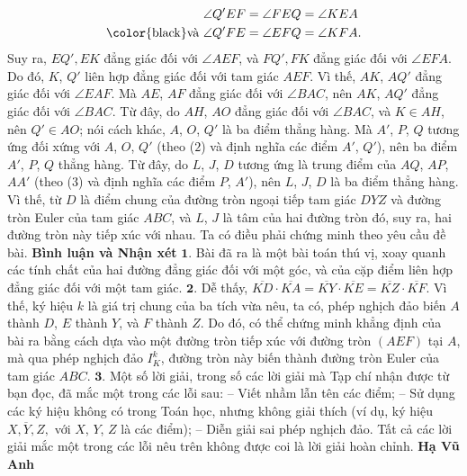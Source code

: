 \begin{multicols}{2}
	\begin{align*}
		&\angle Q'EF = \angle FEQ = \angle KEA \\
		\text{\color{black}và } &\angle Q'FE = \angle EFQ = \angle KFA.
	\end{align*}
	Suy ra, $EQ', EK$ đẳng giác đối với $\angle AEF$, và $FQ', FK$ đẳng giác đối với $\angle EFA$. Do đó, $K$, $Q'$ liên hợp đẳng giác đối với tam giác $AEF$. Vì thế, $AK$, $AQ'$ đẳng giác đối với $\angle EAF$.  Mà $AE$, $AF$ đẳng giác đối với $\angle BAC$,  nên $AK$, $AQ'$ đẳng giác đối với $\angle BAC$. Từ đây, do $AH$, $AO$ đẳng giác đối với $\angle BAC$, và $K \in  AH$, nên  $Q' \in AO$; nói cách khác, $A$, $O$, $Q'$ là ba điểm thẳng hàng. Mà  $A'$, $P$, $Q$ tương ứng đối xứng với $A$, $O$, $Q'$  (theo ($2$) và định nghĩa các điểm  $A'$, $Q'$), nên ba điểm  $A'$, $P$, $Q$  thẳng hàng. Từ đây, do $L$, $J$, $D$ tương ứng là trung điểm của $AQ$, $AP$, $AA'$ (theo ($3$) và định nghĩa các điểm $P$,  $A'$), nên $L$, $J$, $D$ là ba điểm thẳng hàng. Vì thế, từ $D$ là điểm chung của đường tròn ngoại tiếp tam giác $DYZ$ và đường tròn Euler của tam giác $ABC$, và $L$, $J$ là tâm của hai đường tròn đó, suy ra, hai đường tròn này tiếp xúc với nhau. Ta có điều phải chứng minh theo yêu cầu đề bài.
	\vskip 0.05cm
	\textbf{\color{thachthuctoanhoc}Bình luận và Nhận xét}
	\vskip 0.05cm
	$\pmb{1.}$ Bài đã ra là một bài toán thú vị, xoay quanh các tính chất của hai đường đẳng giác đối với một góc, và của cặp điểm liên hợp đẳng giác đối với một tam giác.
	\vskip 0.05cm
	$\pmb{2.}$ Dễ thấy, $\overline {KD}  \cdot \overline {KA}  = \overline {KY}  \cdot \overline {KE}  = \overline {KZ}  \cdot \overline {KF}$. Vì thế, ký hiệu $k$ là giá trị chung của ba tích vừa nêu, ta có, phép nghịch đảo   biến $A$ thành $D$, $E$ thành $Y$, và $F$ thành $Z$. Do đó, có thể chứng minh khẳng định của bài ra bằng cách dựa vào một đường tròn tiếp xúc với đường tròn $(AEF)$ tại $A$, mà qua phép nghịch đảo $I_K^k$, đường tròn này biến thành đường tròn Euler của tam giác $ABC$.
	\vskip 0.05cm
	$\pmb{3.}$ Một số lời giải, trong số các lời giải mà Tạp chí nhận được từ bạn đọc, đã mắc một trong các lỗi sau:
	\vskip 0.05cm
	-- Viết nhầm lẫn tên các điểm;
	\vskip 0.05cm
	-- Sử dụng các ký hiệu không có trong Toán học, nhưng không giải thích (ví dụ, ký hiệu $\overline {X,Y,Z} ,$ với $X$, $Y$, $Z$ là các điểm);
	\vskip 0.05cm
	-- Diễn giải sai phép nghịch đảo.
	\vskip 0.05cm
	Tất cả các lời giải mắc một trong các lỗi nêu trên không được coi là lời giải hoàn chỉnh.
	\vskip 0.05cm
	\hfill	\textbf{\color{thachthuctoanhoc}Hạ Vũ Anh}
	\vskip 0.05cm
	\columnbreak

\end{multicols}
